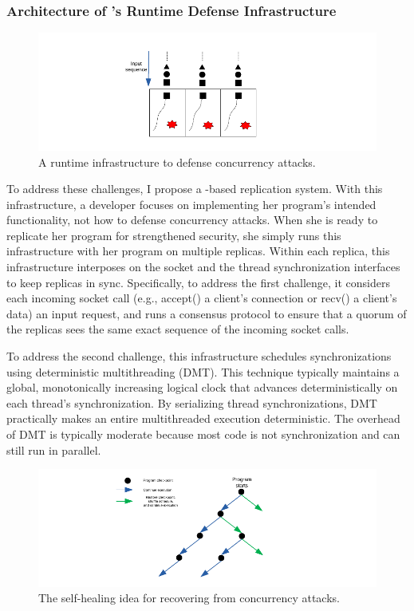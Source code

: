 \subsubsection{Architecture of \xxx's Runtime Defense Infrastructure} 
\label{sec:defense-arch}

\begin{figure}[t]
\centering
\includegraphics[width=0.3\columnwidth]{figures/defense}
\vspace{-.05in}
\caption{{A runtime infrastructure to defense concurrency attacks.}} 
\label{fig:defense}
\vspace{-.05in}
\end{figure}

To address these challenges, I propose a \smr-based replication 
system. With this infrastructure, a developer focuses on implementing her 
program's intended functionality, not how to defense concurrency attacks. When 
she is ready to replicate her program for strengthened security, she simply
runs this infrastructure with her program on multiple replicas. Within
each replica, this infrastructure interposes on the socket and the thread
synchronization interfaces to keep replicas in sync. Specifically, to address 
the first challenge, it considers each incoming socket call (e.g., accept() a 
client's connection or recv() a client's data) an input request, and runs a 
\paxos consensus protocol to ensure that a quorum of the replicas sees the same 
exact sequence of the incoming socket calls.

To address the second challenge, this infrastructure schedules synchronizations 
using deterministic multithreading (DMT). This technique
typically maintains a global, monotonically increasing logical clock that 
advances deterministically on each thread's synchronization. By serializing 
thread synchronizations, DMT practically makes an entire multithreaded 
execution deterministic. The overhead
of DMT is typically moderate because most code is not synchronization and can 
still run in parallel.

\begin{figure}[t]
\centering
\includegraphics[width=0.3\columnwidth]{figures/healing}
\vspace{-.05in}
\caption{{The self-healing idea for recovering from concurrency attacks.}} 
\label{fig:healing}
\vspace{-.05in}
\end{figure}

